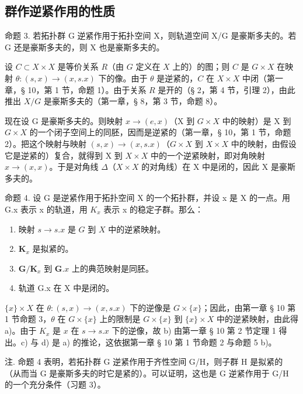 \subsection{群作逆紧作用的性质}

命题 3. 若拓扑群 G 逆紧作用于拓扑空间 X，则轨道空间 X/G 是豪斯多夫的。若 G 还是豪斯多夫的，则 X 也是豪斯多夫的。

设 \(C \subset X \times X\) 是等价关系 \(R\)（由 \(G\) 定义在 \(X\) 上的）的图；则 \(C\) 是 \(G \times X\) 在映射 \(\theta : (s, x) \to (x, s.x)\) 下的像。由于 \(\theta\) 是逆紧的，\(C\) 在 \(X \times X\) 中闭（第一章，§ 10，第 1 节，命题 1）。由于关系 \(R\) 是开的（§ 2，第 4 节，引理 2），由此推出 \(X/G\) 是豪斯多夫的（第一章，§ 8，第 3 节，命题 8）。

现在设 G 是豪斯多夫的。则映射 \(x \to (e, x)\)（X 到 \(G \times X\) 中的映射）是 X 到 \(G \times X\) 的一个闭子空间上的同胚，因而是逆紧的（第一章，§ 10，第 1 节，命题 2）。把这个映射与映射 \((s, x) \to (x, s.x)\)（\(G \times X\) 到 \(X \times X\) 中的映射，由假设它是逆紧的）复合，就得到 X 到 \(X \times X\) 中的一个逆紧映射，即对角映射 \(x \to (x, x)\)。于是对角线 \(\Delta\)（\(X \times X\) 的对角线）在 X 中是闭的，因此 X 是豪斯多夫的。

命题 4. 设 G 是逆紧作用于拓扑空间 X 的一个拓扑群，并设 x 是 X 的一点。用 G.x 表示 x 的轨道，用 \(K_{x}\) 表示 x 的稳定子群。那么：

\begin{enumerate}
\def\labelenumi{\alph{enumi})}
\item
  映射 \(s \to s.x\) 是 \(G\) 到 \(X\) 中的逆紧映射。
\item
  \(\mathbf{K}_x\) 是拟紧的。
\item
  \(\mathbf{G} / \mathbf{K}_x\) 到 \(\mathbf{G}.x\) 上的典范映射是同胚。
\item
  轨道 G.x 在 X 中是闭的。
\end{enumerate}

\(\{x\} \times X\) 在 \(\theta : (s, x) \to (x, s.x)\) 下的逆像是 \(G \times \{x\}\)；因此，由第一章 § 10 第 1 节命题 3，\(\theta\) 在 \(G \times \{x\}\) 上的限制是 \(G \times \{x\}\) 到 \(\{x\} \times X\) 中的逆紧映射，由此得 a)。由于 \(K_x\) 是 \(x\) 在 \(s \to s.x\) 下的逆像，故 b) 由第一章 § 10 第 2 节定理 1 得出。c) 与 d) 是 a) 的推论，这依据第一章 § 10 第 1 节命题 2 与命题 5 b)。

注. 命题 4 表明，若拓扑群 G 逆紧作用于齐性空间 G/H，则子群 H 是拟紧的（从而当 G 是豪斯多夫的时它是紧的）。可以证明，这也是 G 逆紧作用于 G/H 的一个充分条件（习题 3）。

